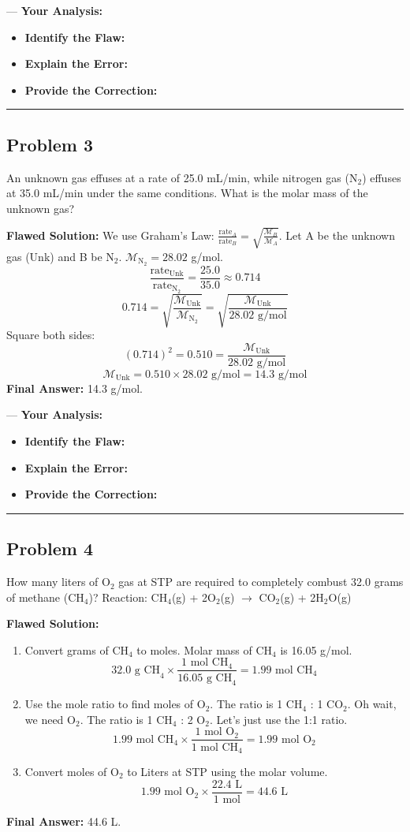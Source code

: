 \documentclass{article}
\begin{document}
---
\textbf{Your Analysis:}
\begin{itemize}
    \item \textbf{Identify the Flaw:}
    \item \textbf{Explain the Error:}
    \item \textbf{Provide the Correction:}
\end{itemize}
\rule{\textwidth}{0.4pt}

\subsection{Problem 3}
An unknown gas effuses at a rate of 25.0 mL/min, while nitrogen gas (N$_2$) effuses at 35.0 mL/min under the same conditions. What is the molar mass of the unknown gas?

\textbf{Flawed Solution:}
We use Graham's Law: $\frac{\text{rate}_A}{\text{rate}_B} = \sqrt{\frac{\mathcal{M}_B}{\mathcal{M}_A}}$.
Let A be the unknown gas (Unk) and B be N$_2$. $\mathcal{M}_{\text{N}_2} = 28.02$ g/mol.
\[ \frac{\text{rate}_{\text{Unk}}}{\text{rate}_{\text{N}_2}} = \frac{25.0}{35.0} \approx 0.714 \]
\[ 0.714 = \sqrt{\frac{\mathcal{M}_{\text{Unk}}}{\mathcal{M}_{\text{N}_2}}} = \sqrt{\frac{\mathcal{M}_{\text{Unk}}}{28.02 \text{ g/mol}}} \]
Square both sides:
\[ (0.714)^2 = 0.510 = \frac{\mathcal{M}_{\text{Unk}}}{28.02 \text{ g/mol}} \]
\[ \mathcal{M}_{\text{Unk}} = 0.510 \times 28.02 \text{ g/mol} = 14.3 \text{ g/mol} \]
\textbf{Final Answer:} 14.3 g/mol.

---
\textbf{Your Analysis:}
\begin{itemize}
    \item \textbf{Identify the Flaw:}
    \item \textbf{Explain the Error:}
    \item \textbf{Provide the Correction:}
\end{itemize}
\rule{\textwidth}{0.4pt}

\subsection{Problem 4}
How many liters of O$_2$ gas at STP are required to completely combust 32.0 grams of methane (CH$_4$)?
Reaction: CH$_4$(g) + 2O$_2$(g) $\rightarrow$ CO$_2$(g) + 2H$_2$O(g)

\textbf{Flawed Solution:}
\begin{enumerate}
    \item Convert grams of CH$_4$ to moles. Molar mass of CH$_4$ is 16.05 g/mol.
    \[ 32.0 \text{ g CH}_4 \times \frac{1 \text{ mol CH}_4}{16.05 \text{ g CH}_4} = 1.99 \text{ mol CH}_4 \]
    \item Use the mole ratio to find moles of O$_2$. The ratio is 1 CH$_4$ : 1 CO$_2$. Oh wait, we need O$_2$. The ratio is 1 CH$_4$ : 2 O$_2$. Let's just use the 1:1 ratio.
    \[ 1.99 \text{ mol CH}_4 \times \frac{1 \text{ mol O}_2}{1 \text{ mol CH}_4} = 1.99 \text{ mol O}_2 \]
    \item Convert moles of O$_2$ to Liters at STP using the molar volume.
    \[ 1.99 \text{ mol O}_2 \times \frac{22.4 \text{ L}}{1 \text{ mol}} = 44.6 \text{ L} \]
\end{enumerate}
\textbf{Final Answer:} 44.6 L.
\end{document}
